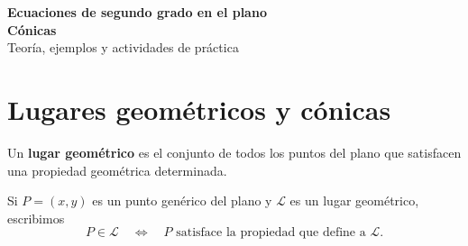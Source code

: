 \documentclass[11pt]{article}
\begin{document}


\begin{center}
{\Large\bfseries Ecuaciones de segundo grado en el plano}\\[1mm]
{\LARGE\bfseries Cónicas}\\[2mm]
{\large Teoría, ejemplos y actividades de práctica}
\end{center}

\section*{Lugares geométricos y cónicas}
\begin{mdframed}[style=teoSty,frametitle={Lugar geométrico}]
Un \textbf{lugar geométrico} es el conjunto de todos los puntos del plano que satisfacen una propiedad geométrica determinada.

Si $P=(x,y)$ es un punto genérico del plano y $\mathcal L$ es un lugar geométrico, escribimos
\[
P\in\mathcal L
\quad\Longleftrightarrow\quad
P \text{ satisface la propiedad que define a }\mathcal L.
\]
\end{mdframed}
\end{document}
